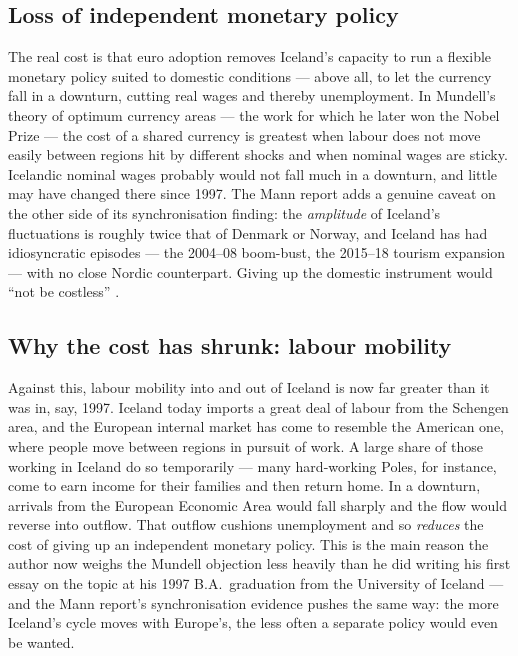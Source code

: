 \documentclass[11pt,a4paper]{article}
\begin{document}
\subsection{Loss of independent monetary policy}
The real cost is that euro adoption removes Iceland's capacity to run a
flexible monetary policy suited to domestic conditions --- above all, to let
the currency fall in a downturn, cutting real wages and thereby unemployment.
In Mundell's theory of optimum currency areas --- the work for which he later
won the Nobel Prize \citep{mundell1961} --- the cost of a shared currency is
greatest when labour does not move easily between regions hit by different
shocks and when nominal wages are sticky. Icelandic nominal wages probably
would not fall much in a downturn, and little may have changed there since
1997. The Mann report adds a genuine caveat on the other side of its
synchronisation finding: the \emph{amplitude} of Iceland's fluctuations is
roughly twice that of Denmark or Norway, and Iceland has had idiosyncratic
episodes --- the 2004--08 boom-bust, the 2015--18 tourism expansion --- with
no close Nordic counterpart. Giving up the domestic instrument would
``not be costless'' \citep{mann2026}.

\subsection{Why the cost has shrunk: labour mobility}
Against this, labour mobility into and out of Iceland is now far greater than
it was in, say, 1997. Iceland today imports a great deal of labour from the
Schengen area, and the European internal market has come to resemble the
American one, where people move between regions in pursuit of work. A large
share of those working in Iceland do so temporarily --- many hard-working
Poles, for instance, come to earn income for their families and then return
home. In a downturn, arrivals from the European Economic Area would fall
sharply and the flow would reverse into outflow. That outflow cushions
unemployment and so \emph{reduces} the cost of giving up an independent
monetary policy. This is the main reason the author now weighs the Mundell
objection less heavily than he did writing his first essay on the topic at his
1997 B.A.\ graduation from the University of Iceland --- and the Mann report's
synchronisation evidence pushes the same way: the more Iceland's cycle moves
with Europe's, the less often a separate policy would even be wanted.
\end{document}
